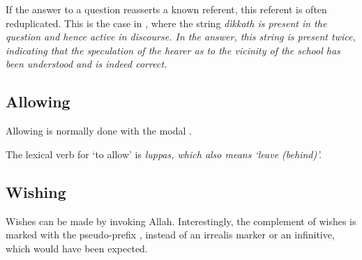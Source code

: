 If the answer to a question reasserts a known referent, this referent is often reduplicated. This is the case in , where the string \em dìkkath \em is present in the question and hence active in discourse. In the answer, this string is present twice, indicating that the speculation of the hearer as to the vicinity of the school has been understood and is indeed correct.


\subsection{Allowing}\label{sec:pragm:Allowing}
Allowing is normally done with the modal  .


The lexical verb for `to allow' is \em luppas\em, which also means  `leave (behind)'.


\subsection{Wishing}\label{sec:pragm:...makeawish}
Wishes can be made by invoking Allah. Interestingly, the complement of wishes is marked with the pseudo-prefix , instead of an irrealis marker or an infinitive, which would have been expected.


